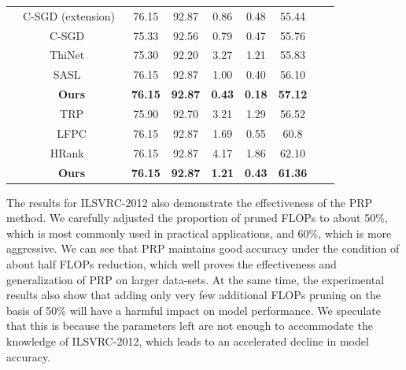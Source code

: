 \documentclass[journal,article,submit,pdftex,moreauthors]{Definitions/mdpi}
\begin{document}
\begin{table}[t]
\begin{tabular}{@{}ccccccccc@{}}
                           & C-SGD (extension)~\cite{csgd} & 76.15          & 92.87           & 0.86                    & 0.48                    & 55.44                     \\
                           & C-SGD ~\cite{csgd}           & 75.33          & 92.56            & 0.79                    & 0.47                    & 55.76                     \\
                           & ThiNet ~\cite{thinet}           & 75.30          & 92.20             & 3.27                    & 1.21                    & 55.83                     \\
                           & SASL ~\cite{sasl}             & 76.15          & 92.87            & 1.00                    & 0.40                    & 56.10                     \\
\textbf{}                  & \textbf{Ours}           & \textbf{76.15} & \textbf{92.87} & \textbf{0.43}           & \textbf{0.18}           & \textbf{57.12}            \\
                           & TRP \cite{trp}              & 75.90          & 92.70           & 3.21                    & 1.29                    & 56.52                     \\
                           & LFPC \cite{lfpc}             & 76.15          & 92.87           & 1.69                    & 0.55                    & 60.8                      \\
                           & HRank ~\cite{hrank}            & 76.15          & 92.87            & 4.17                    & 1.86                    & 62.10                     \\
\textbf{}                  & \textbf{Ours}           & \textbf{76.15} & \textbf{92.87}  & \textbf{1.21}           & \textbf{0.43}           & \textbf{61.36}            \\  \bottomrule
\end{tabular}
\end{table}


The results for ILSVRC-2012 also demonstrate the effectiveness of the PRP method. We carefully adjusted the proportion of pruned FLOPs to about 50\%, which is most commonly used in practical applications, and 60\%, which is more aggressive. We can see that PRP maintains good accuracy under the condition of about half FLOPs reduction, which well proves the effectiveness and generalization of PRP on larger data-sets. At the same time, the experimental results also show that adding only very few additional FLOPs pruning on the basis of 50\% will have a harmful impact on model performance. We speculate that this is because the parameters left are not enough to accommodate the knowledge of ILSVRC-2012, which leads to an accelerated decline in model accuracy.
\end{document}
